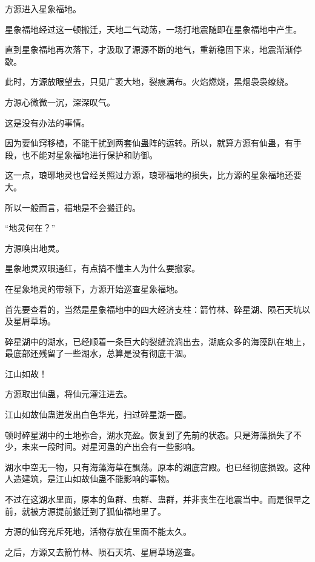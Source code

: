 
\begin{this_body}



方源进入星象福地。

星象福地经过这一顿搬迁，天地二气动荡，一场打地震随即在星象福地中产生。

直到星象福地再次落下，才汲取了源源不断的地气，重新稳固下来，地震渐渐停歇。

此时，方源放眼望去，只见广袤大地，裂痕满布。火焰燃烧，黑烟袅袅缭绕。

方源心微微一沉，深深叹气。

这是没有办法的事情。

因为要仙窍移植，不能干扰到两套仙蛊阵的运转。所以，就算方源有仙蛊，有手段，也不能对星象福地进行保护和防御。

这一点，琅琊地灵也曾经关照过方源，琅琊福地的损失，比方源的星象福地还要大。

所以一般而言，福地是不会搬迁的。

“地灵何在？”

方源唤出地灵。

星象地灵双眼通红，有点搞不懂主人为什么要搬家。

在星象地灵的带领下，方源开始巡查星象福地。

首先要查看的，当然是星象福地中的四大经济支柱：箭竹林、碎星湖、陨石天坑以及星屑草场。

碎星湖中的湖水，已经顺着一条巨大的裂缝流淌出去，湖底众多的海藻趴在地上，最底部还残留了一些湖水，总算是没有彻底干涸。

江山如故！

方源取出仙蛊，将仙元灌注进去。

江山如故仙蛊迸发出白色华光，扫过碎星湖一圈。

顿时碎星湖中的土地弥合，湖水充盈。恢复到了先前的状态。只是海藻损失了不少，未来一段时间。对星河蛊的产出会有一些影响。

湖水中空无一物，只有海藻海草在飘荡。原本的湖底宫殿。也已经彻底损毁。这种人造建筑，是江山如故仙蛊不能影响的事物。

不过在这湖水里面，原本的鱼群、虫群、蛊群，并非丧生在地震当中。而是很早之前，就被方源提前搬迁到了狐仙福地里了。

方源的仙窍充斥死地，活物存放在里面不能太久。

之后，方源又去箭竹林、陨石天坑、星屑草场巡查。


\end{this_body}
